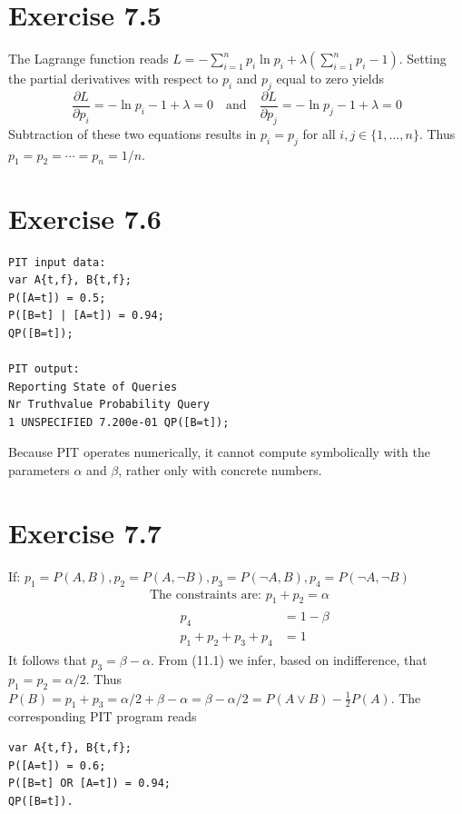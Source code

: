 \documentclass[10pt]{book}
\begin{document}
\section{Exercise 7.5}
The Lagrange function reads $L=-\sum_{i=1}^{n} p_{i} \ln p_{i}+\lambda\left(\sum_{i=1}^{n} p_{i}-1\right)$. Setting the partial derivatives with respect to $p_{i}$ and $p_{j}$ equal to zero yields
\[
\frac{\partial L}{\partial p_{i}}=-\ln p_{i}-1+\lambda=0 \quad \text{and} \quad \frac{\partial L}{\partial p_{j}}=-\ln p_{j}-1+\lambda=0
\]
Subtraction of these two equations results in $p_{i}=p_{j}$ for all $i, j \in\{1, \ldots, n\}$. Thus $p_{1}=p_{2}=\cdots=p_{n}=1 / n$.

\section{Exercise 7.6}
\begin{verbatim}
PIT input data:
var A{t,f}, B{t,f};
P([A=t]) = 0.5;
P([B=t] | [A=t]) = 0.94;
QP([B=t]);

PIT output:
Reporting State of Queries
Nr Truthvalue Probability Query
1 UNSPECIFIED 7.200e-01 QP([B=t]);
\end{verbatim}

Because PIT operates numerically, it cannot compute symbolically with the parameters $\alpha$ and $\beta$, rather only with concrete numbers.

\section{Exercise 7.7}
If: $p_{1}=P(A, B), p_{2}=P(A, \neg B), p_{3}=P(\neg A, B), p_{4}=P(\neg A, \neg B)$
\begin{align*}
& \text{The constraints are: } p_{1}+p_{2}=\alpha \tag{11.1}\\
& \qquad \begin{aligned}
p_{4} & =1-\beta \\
p_{1}+p_{2}+p_{3}+p_{4} & =1
\end{aligned} \tag{11.2}
\end{align*}
It follows that $p_{3}=\beta-\alpha$. From (11.1) we infer, based on indifference, that $p_{1}=p_{2}=\alpha / 2$. Thus $P(B)=p_{1}+p_{3}=\alpha / 2+\beta-\alpha=\beta-\alpha / 2=P(A \vee B)-\tfrac{1}{2} P(A)$. The corresponding PIT program reads
\begin{verbatim}
var A{t,f}, B{t,f};
P([A=t]) = 0.6;
P([B=t] OR [A=t]) = 0.94;
QP([B=t]).
\end{verbatim}
\end{document}
